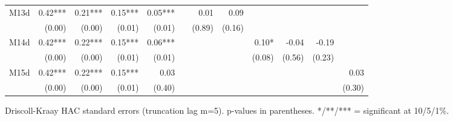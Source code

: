 \begin{table}[htbp]
{\begin{tabular}{lrrrrrrrrrrr}
M13d & 0.42*** & 0.21*** & 0.15*** & 0.05*** &  & 0.01 & 0.09 &  &  &  &  \\
 & (0.00) & (0.00) & (0.01) & (0.01) &  & (0.89) & (0.16) &  &  &  &  \\
M14d & 0.42*** & 0.22*** & 0.15*** & 0.06*** &  &  &  & 0.10* & -0.04 & -0.19 &  \\
 & (0.00) & (0.00) & (0.01) & (0.01) &  &  &  & (0.08) & (0.56) & (0.23) &  \\
M15d & 0.42*** & 0.22*** & 0.15*** & 0.03 &  &  &  &  &  &  & 0.03 \\
 & (0.00) & (0.00) & (0.01) & (0.40) &  &  &  &  &  &  & (0.30) \\
\bottomrule
\end{tabular}%
}
\smallskip
\small
\noindent Driscoll-Kraay HAC standard errors (truncation lag m=5). p-values in parentheses. */**/*** = significant at 10/5/1\%.
\end{table}